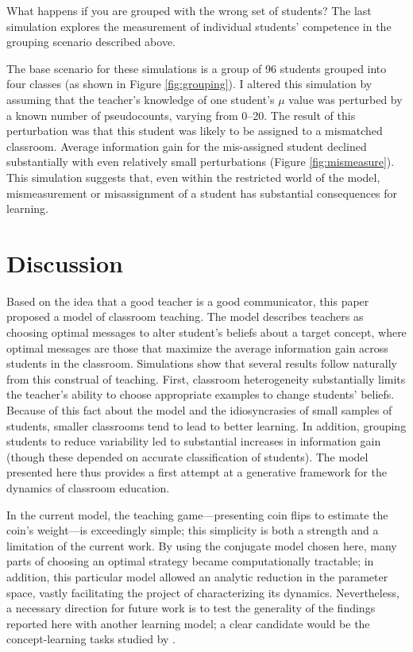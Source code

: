\documentclass[10pt,letterpaper]{article}
\begin{document}
What happens if you are grouped with the wrong set of students? The last simulation explores the measurement of individual students' competence in the grouping scenario described above. 

The base scenario for these simulations is a group of 96 students grouped into four classes (as shown in Figure \ref{fig:grouping}). I altered this simulation by assuming that the teacher's knowledge of one student's $\mu$ value was perturbed by a known number of pseudocounts, varying from 0--20. The result of this perturbation was that this student was likely to be assigned to a mismatched classroom. Average information gain for the mis-assigned student declined substantially with even relatively small perturbations (Figure \ref{fig:mismeasure}). This simulation suggests that, even within the restricted world of the model, mismeasurement or misassignment of a student has substantial consequences for learning.

\section{Discussion}

Based on the idea that a good teacher is a good communicator, this paper proposed a model of classroom teaching. The model describes teachers as choosing optimal messages to alter student's beliefs about a target concept, where optimal messages are those that maximize the average information gain across students in the classroom. Simulations show that several results follow naturally from this construal of teaching. First, classroom heterogeneity substantially limits the teacher's ability to choose appropriate examples to change students' beliefs. Because of this fact about the model and the idiosyncrasies of small samples of students, smaller classrooms tend to lead to better learning. In addition, grouping students to reduce variability led to substantial increases in information gain (though these depended on accurate classification of students). The model presented here thus provides a first attempt at a generative framework for the dynamics of classroom education. 

In the current model, the teaching game---presenting coin flips to estimate the coin's weight---is exceedingly simple; this simplicity is both a strength and a limitation of the current work. By using the conjugate model chosen here, many parts of choosing an optimal strategy became computationally tractable; in addition, this particular model allowed an analytic reduction in the parameter space, vastly facilitating the project of characterizing its dynamics. Nevertheless, a necessary direction for future work is to test the generality of the findings reported here with another learning model; a clear candidate would be the concept-learning tasks studied by . 
\end{document}
